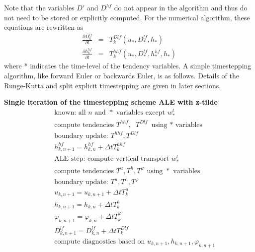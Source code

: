 \documentclass[11pt]{report}
\newcommand{\ds}{\displaystyle}
\newcommand{\bea}{\begin{eqnarray}}
\newcommand{\eea}{\end{eqnarray}}
\begin{document}
Note that the variables $D'$ and $D^{hf}$ do not appear in the algorithm and thus do not need to be stored or explicitly computed.  For the numerical algorithm, these equations are rewritten as
\bea
\label{h1t2} \ds
  \frac{\partial D^{lf}_k}{\partial t} &=& T^{Dlf}_k(u_{*}, D^{lf}_{*},h_*) \\
  \frac{\partial h^{hf}_k}{\partial t} &=& T^{hhf}_k(u_{*}, D^{lf}_{*}, h_{*}^{hf},h_*)
\eea
where * indicates the time-level of the tendency variables.  A simple timestepping algorithm, like forward Euler or backwards Euler, is as follows.  Details of the Runge-Kutta and split explicit timestepping are given in later sections.

{\bf Single iteration of the timestepping scheme ALE with z-tilde}
\begin{eqnarray} &&
\mbox{known: all $n$ and $*$ variables except $w^t_*$}\\&&
\mbox{compute tendencies } 
T^{hhf}, \;\;
T^{Dlf} \mbox{ using $*$ variables} \\ && 
\mbox{boundary update: } T^{hhf},T^{Dlf}\\&& 
h^{hf}_{k,n+1} = h^{hf}_{k,n} + \Delta t T^{hhf}_k \\&& 
\mbox{ALE step: compute vertical transport $w^t_*$} \\&&
\mbox{compute tendencies $T^u, T^h, T^\varphi $ using $*$ variables}\\ && 
\mbox{boundary update: } T^u,T^h,T^\varphi\\&& 
u_{k,n+1} = u_{k,n+1} + \Delta t T^u_k \\&& 
h_{k,n+1} = h_{k,n} + \Delta t T^h_k \\&& 
{\varphi}_{k,n+1} =  \varphi_{k,n} + \Delta t  T^\varphi_k \\&&
D^{lf}_{k,n+1} = D^{lf}_{k,n} + \Delta t T^{Dlf}_k \\&& 
\mbox{compute diagnostics based on }u_{k,n+1},h_{k,n+1},\varphi_{k,n+1} 
\end{eqnarray}

\end{document}
